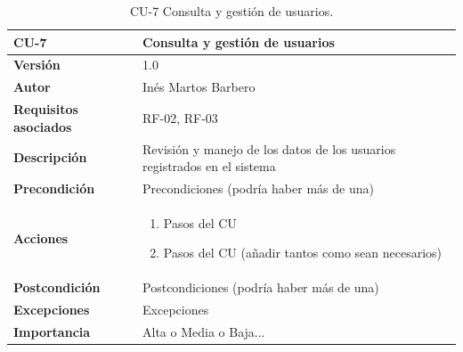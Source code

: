 \begin{table}[p]
	\centering
	\begin{tabularx}{\linewidth}{ p{} p{} }
		\toprule
		\textbf{CU-7}    & \textbf{Consulta y gestión de usuarios}\\
		\toprule
		\textbf{Versión}              & 1.0    \\
		\textbf{Autor}                & Inés Martos Barbero \\
		\textbf{Requisitos asociados} & RF-02, RF-03 \\
		\textbf{Descripción}          & Revisión y manejo de los datos de los usuarios registrados en el sistema \\
		\textbf{Precondición}         & Precondiciones (podría haber más de una) \\
		\textbf{Acciones}             &
		\begin{enumerate}
			\def\labelenumi{\arabic{enumi}.}
			\tightlist
			\item Pasos del CU
			\item Pasos del CU (añadir tantos como sean necesarios)
		\end{enumerate}\\
		\textbf{Postcondición}        & Postcondiciones (podría haber más de una) \\
		\textbf{Excepciones}          & Excepciones \\
		\textbf{Importancia}          & Alta o Media o Baja... \\
		\bottomrule
	\end{tabularx}
	\caption{CU-7 Consulta y gestión de usuarios.}
\end{table}

